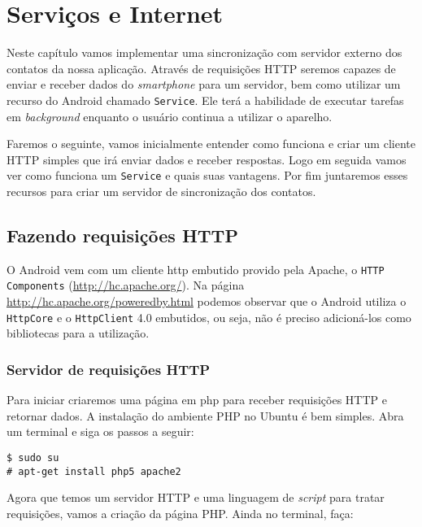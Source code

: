 \chapter{Serviços e Internet}

Neste capítulo vamos implementar uma sincronização com servidor externo dos contatos da nossa
aplicação. Através de requisições HTTP seremos capazes de enviar e receber dados do \textit{smartphone}
para um servidor, bem como utilizar um recurso do Android chamado \texttt{Service}. Ele terá a habilidade
de executar tarefas em \textit{background} enquanto o usuário continua a utilizar o aparelho.

Faremos o seguinte, vamos inicialmente entender como funciona e criar um cliente HTTP simples
que irá enviar dados e receber respostas. Logo em seguida vamos ver como funciona um \texttt{Service}
e quais suas vantagens. Por fim juntaremos esses recursos para criar um servidor de sincronização
dos contatos.

\section{Fazendo requisições HTTP}

O Android vem com um cliente \gls{http} embutido provido pela Apache, o \texttt{HTTP Components}
(\url{http://hc.apache.org/}). Na página \url{http://hc.apache.org/poweredby.html} podemos
observar que o Android utiliza o \texttt{HttpCore} e o \texttt{HttpClient} 4.0 embutidos,
ou seja, não é preciso adicioná-los como bibliotecas para a utilização.

\subsection{Servidor de requisições HTTP}

Para iniciar criaremos uma página em \gls{php} para receber requisições HTTP e retornar dados.
A instalação do ambiente PHP no Ubuntu é bem simples. Abra um terminal e siga os passos a seguir:

\begin{flushleft}\texttt{\$ sudo su\\
\# apt-get install php5 apache2\\}
\end{flushleft}

Agora que temos um servidor HTTP e uma linguagem de \textit{script} para tratar requisições, vamos
a criação da página PHP. Ainda no terminal, faça:

